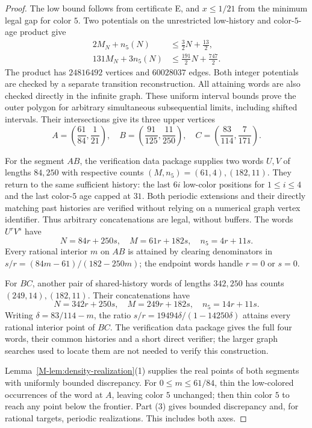 \documentclass[11pt,reqno]{amsart}
\theoremstyle{plain}
\theoremstyle{plain}
\theoremstyle{plain}
\begin{document}
\begin{proof}
The low bound follows from certificate E, and $x\le1/21$ from the minimum
legal gap for color $5$. Two potentials on the unrestricted low-history
and color-$5$-age product give
\begin{align}
 2M_N+n_5(N)&\le\frac32N+\frac{13}{2},\label{M-eq:global-low2}\\
 131M_N+3n_5(N)&\le\frac{191}{2}N+\frac{747}{2}.
 \label{M-eq:global-low131}
\end{align}
The product has $24816492$ vertices and $60028037$ edges. Both integer
potentials are checked by a separate transition reconstruction. All attaining
words are also checked directly in the infinite graph. These uniform interval bounds prove the outer
polygon for arbitrary simultaneous subsequential limits, including shifted
intervals. Their intersections give its three upper vertices
\[
 A=\left(\frac{61}{84},\frac1{21}\right),\quad
 B=\left(\frac{91}{125},\frac{11}{250}\right),\quad
 C=\left(\frac{83}{114},\frac7{171}\right).
\]

For the segment $AB$, the verification data package supplies two words $U,V$ of lengths
$84,250$ with respective counts $(M,n_5)=(61,4),(182,11)$.
They return to the same sufficient history: the last $6i$ low-color
positions for $1\le i\le4$ and the last color-$5$ age capped at $31$.
Both periodic extensions and their directly matching past histories are
verified without relying on a numerical graph vertex identifier. Thus
arbitrary concatenations are legal, without buffers. The words $U^rV^s$
have
\[
 N=84r+250s,\quad M=61r+182s,\quad n_5=4r+11s.
\]
Every rational interior $m$ on $AB$ is attained by clearing denominators
in $s/r=(84m-61)/(182-250m)$; the endpoint words handle $r=0$ or $s=0$.

For $BC$, another pair of shared-history words of lengths $342,250$ has
counts $(249,14),(182,11)$. Their concatenations have
\[
 N=342r+250s,\quad M=249r+182s,\quad n_5=14r+11s.
\]
Writing $\delta=83/114-m$, the ratio
$s/r=19494\delta/(1-14250\delta)$ attains every rational interior point
of $BC$. The verification data package gives the full four words, their common histories
and a short direct verifier; the larger graph searches used to locate them
are not needed to verify this construction.

Lemma~\ref{M-lem:density-realization}(1) supplies the real points of
both segments with uniformly bounded discrepancy. For
$0\le m\le61/84$, thin the low-colored occurrences of the word at
$A$, leaving color $5$ unchanged; then thin color $5$ to reach any
point below the frontier. Part (3) gives bounded discrepancy and,
for rational targets, periodic realizations. This includes both axes.
\end{proof}
\end{document}
